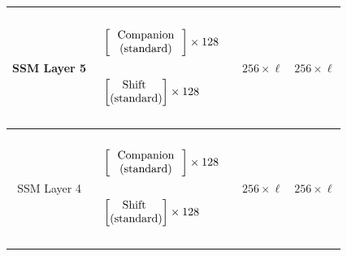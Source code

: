 \begin{table}[]
\begin{tabular}{@{}c|c|c|c@{}}
SSM Layer 5 & \begin{math}\begin{aligned}    \begin{matrix}    \text{\phantom{-}} \\    \end{matrix}    \\    &    \begin{bmatrix}    \text{\phantom{-} Companion \phantom{-}}   \\ \text{(standard)} \\    \end{bmatrix}    \times 128     \\    \begin{matrix}    \text{\phantom{-}} \\    \end{matrix}    \\    &    \begin{bmatrix}    \text{\phantom{-} Shift \phantom{-} }   \\ \text{(standard)} \\    \end{bmatrix}     \times 128       \\     \begin{matrix}    \text{\phantom{-}} \\    \end{matrix}    \\\end{aligned}\end{math} & $256 \times \ell$ & $256 \times \ell$ \\ \midrule
SSM Layer 4 & \begin{math}\begin{aligned}    \begin{matrix}    \text{\phantom{-}} \\    \end{matrix}    \\    &    \begin{bmatrix}    \text{\phantom{-} Companion \phantom{-}}   \\ \text{(standard)} \\    \end{bmatrix}    \times 128     \\    \begin{matrix}    \text{\phantom{-}} \\    \end{matrix}    \\    &    \begin{bmatrix}    \text{\phantom{-} Shift \phantom{-} }   \\ \text{(standard)} \\    \end{bmatrix}     \times 128       \\     \begin{matrix}    \text{\phantom{-}} \\    \end{matrix}    \\\end{aligned}\end{math} & $256 \times \ell$ & $256 \times \ell$ \\ \midrule

\end{tabular}
\end{table}
